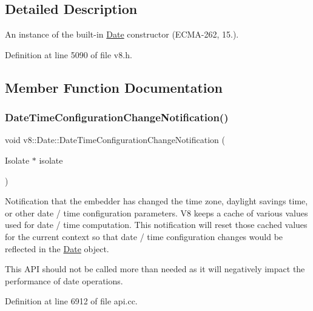 \subsection{Detailed Description}
An instance of the built-\/in \mbox{\hyperlink{classv8_1_1Date}{Date}} constructor (E\+C\+M\+A-\/262, 15.). 

Definition at line 5090 of file v8.\+h.



\subsection{Member Function Documentation}
\mbox{\label{classv8_1_1Date_afa8f4fb31292d1914d9a89fab4fa4415}} 
\subsubsection{\texorpdfstring{Date\+Time\+Configuration\+Change\+Notification()}{DateTimeConfigurationChangeNotification()}}
{\footnotesize\ttfamily void v8\+::\+Date\+::\+Date\+Time\+Configuration\+Change\+Notification (\begin{DoxyParamCaption}\item[{Isolate $\ast$}]{isolate }\end{DoxyParamCaption})\hspace{0.3cm}{\ttfamily [static]}}

Notification that the embedder has changed the time zone, daylight savings time, or other date / time configuration parameters. V8 keeps a cache of various values used for date / time computation. This notification will reset those cached values for the current context so that date / time configuration changes would be reflected in the \mbox{\hyperlink{classv8_1_1Date}{Date}} object.

This A\+PI should not be called more than needed as it will negatively impact the performance of date operations. 

Definition at line 6912 of file api.\+cc.

\mbox{\label{classv8_1_1Date_adb9d292549a173e045ee177051dbde19}} 
